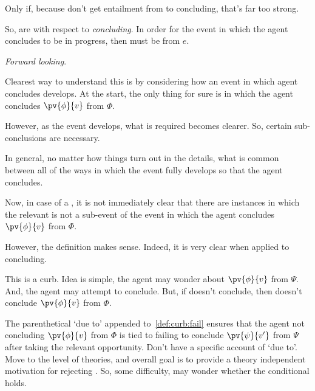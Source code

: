 \begin{note}
  {
    \color{red}
    Only if, because don't get entailment from \pevent{} to concluding, that's far too strong.
  }

  So,  are with respect to \emph{concluding}.
  In order for the event in which the agent concludes to be in progress, then must be \pevent{} from \(e\).

  \emph{Forward looking}.

  Clearest way to understand this is by considering how an event in which agent concludes develops.
  At the start, the only thing for sure is \pevent{} in which the agent concludes \(\pv{\phi}{v}\) from \(\Phi\).

  However, as the event develops, what is required becomes clearer.
  So, certain sub-conclusions are necessary.

  In general, no matter how things turn out in the details, what is common between all of the ways in which the event fully develops so that the agent concludes.
\end{note}

\begin{note}
  Now, in case of a \curb{}, it is not immediately clear that there are instances in which the relevant \pevent{} is not a sub-event of the event in which the agent concludes \(\pv{\phi}{v}\) from \(\Phi\).

  However, the definition makes sense.
  Indeed, it is very clear when applied to concluding.
\end{note}

\begin{note}
  This is a curb.
  Idea is simple, the agent may wonder about \(\pv{\phi}{v}\) from \(\Psi\).
  And, the agent may attempt to conclude.
  But, if doesn't conclude, then doesn't conclude \(\pv{\phi}{v}\) from \(\Phi\).
\end{note}

\begin{note}
  The parenthetical `due to' appended to~\ref{def:curb:fail} ensures that the agent not concluding \(\pv{\phi}{v}\) from \(\Phi\) is tied to failing to conclude \(\pv{\psi}{v'}\) from \(\Psi\) after taking the relevant opportunity.
  Don't have a specific account of `due to'.
  Move to the level of theories, and overall goal is to provide a theory independent motivation for rejecting \issueConstraint{}.
  So, some difficulty, may wonder whether the conditional holds.
\end{note}

\section{}
\label{sec:illu3}

